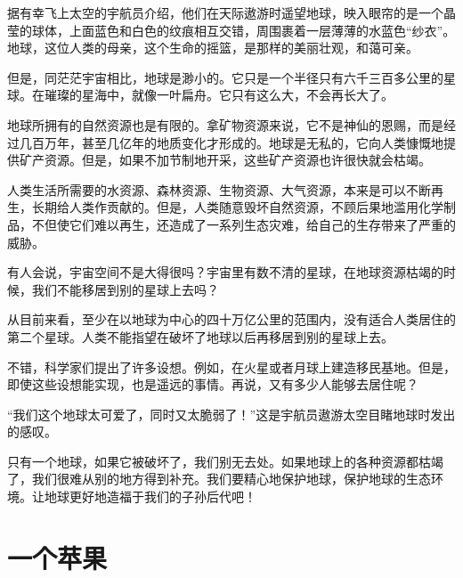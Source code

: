 \documentclass[12pt,UTF-8,openany]{ctexbook}
\begin{document}
\begin{Large}
    
    据有幸飞上太空的宇航员介绍，他们在天际遨游时遥望地球，映入眼帘的是一个晶莹的球体，上面蓝色和白色的纹痕相互交错，周围裹着一层薄薄的水蓝色“纱衣”。地球，这位人类的母亲，这个生命的摇篮，是那样的美丽壮观，和蔼可亲。
    
    但是，同茫茫宇宙相比，地球是渺小的。它只是一个半径只有六千三百多公里的星球。在璀璨的星海中，就像一叶扁舟。它只有这么大，不会再长大了。
    
    地球所拥有的自然资源也是有限的。拿矿物资源来说，它不是神仙的恩赐，而是经过几百万年，甚至几亿年的地质变化才形成的。地球是无私的，它向人类慷慨地提供矿产资源。但是，如果不加节制地开采，这些矿产资源也许很快就会枯竭。
    
    人类生活所需要的水资源、森林资源、生物资源、大气资源，本来是可以不断再生，长期给人类作贡献的。但是，人类随意毁坏自然资源，不顾后果地滥用化学制品，不但使它们难以再生，还造成了一系列生态灾难，给自己的生存带来了严重的威胁。
    
    有人会说，宇宙空间不是大得很吗？宇宙里有数不清的星球，在地球资源枯竭的时候，我们不能移居到别的星球上去吗？
    
    从目前来看，至少在以地球为中心的四十万亿公里的范围内，没有适合人类居住的第二个星球。人类不能指望在破坏了地球以后再移居到别的星球上去。
    
    不错，科学家们提出了许多设想。例如，在火星或者月球上建造移民基地。但是，即使这些设想能实现，也是遥远的事情。再说，又有多少人能够去居住呢？
    
    “我们这个地球太可爱了，同时又太脆弱了！”这是宇航员遨游太空目睹地球时发出的感叹。
    
    只有一个地球，如果它被破坏了，我们别无去处。如果地球上的各种资源都枯竭了，我们很难从别的地方得到补充。我们要精心地保护地球，保护地球的生态环境。让地球更好地造福于我们的子孙后代吧！
    
\end{Large}

\chapter{一个苹果}
\end{document}
